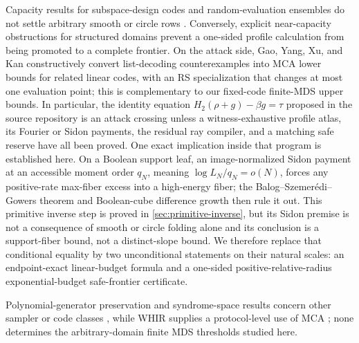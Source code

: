\documentclass[11pt,a4paper]{amsart}
\numberwithin{equation}{section}
\theoremstyle{remark}
\begin{document}
Capacity results for subspace-design codes and random-evaluation ensembles
do not settle arbitrary smooth or circle rows
\cite{GoyalGuruswami25,GoyalGuruswamiSunWootters26}.  Conversely, explicit
near-capacity obstructions for structured domains
\cite{CS25,KKH26,Kambire26} prevent a one-sided profile calculation from
being promoted to a complete frontier.  On the attack side, Gao, Yang, Xu,
and Kan \cite{GaoYangXuKan26} constructively convert list-decoding
counterexamples into MCA lower bounds for related linear codes, with an
RS specialization that changes at most one evaluation point; this is
complementary to our fixed-code finite-MDS upper bounds.  In particular, the identity equation
\(H_2(\rho+g)-\beta g=\tau\) proposed in the source repository
\cite{RSMCARepo} is an attack crossing
unless a witness-exhaustive profile atlas, its Fourier or Sidon payments,
the residual ray compiler, and a matching safe reserve have all been proved.
One exact implication inside that program is established here.  On a
Boolean support leaf, an image-normalized Sidon payment at an accessible
moment order \(q_N\), meaning \(\log L_N/q_N=o(N)\), forces any positive-rate
max-fiber excess into a high-energy fiber; the Balog--Szemer\'edi--Gowers
theorem and Boolean-cube difference growth then rule it out.  This
primitive inverse step is proved in
\cref{sec:primitive-inverse}, but its Sidon premise is not a consequence of
smooth or circle folding alone and its conclusion is a support-fiber bound,
not a distinct-slope bound.
We therefore replace that conditional equality by two unconditional
statements on their natural scales: an endpoint-exact linear-budget formula
and a one-sided positive-relative-radius exponential-budget safe-frontier
certificate.

Polynomial-generator preservation and syndrome-space results concern other
sampler or code classes \cite{BordageChiesaGuanManzur25,YuanZhu26}, while
WHIR supplies a protocol-level use of MCA \cite{WHIR}; none determines the
arbitrary-domain finite MDS thresholds studied here.
\end{document}

